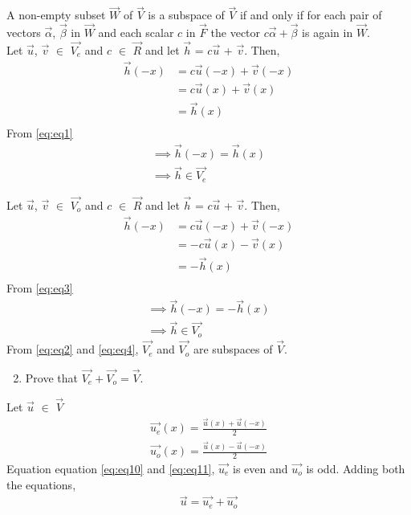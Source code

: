 \documentclass[journal,12pt,twocolumn]{IEEEtran}
\begin{document}
A non-empty subset $\vec{W}$ of $\vec{V}$ is a subspace of $\vec{V}$ if and only if for each pair of vectors $\vec{\alpha}$, $\vec{\beta}$ in $\vec{W}$ and each scalar $c$ in $\vec{F}$ the vector $c\vec{\alpha}+\vec{\beta}$ is again in $\vec{W}$.\\

Let $\vec{u}$, $\vec{v}$ $\in$ $\vec{V_e}$ and $c$ $\in$ $\vec{R}$ and let $\vec{h}$ = $c\vec{u}$ + $\vec{v}$. Then,
\begin{equation} \label{eq:eq1}
\begin{split}
\vec{h}(-x) &= c \vec{u}(-x) + \vec{v}(-x)\\
 & = c \vec{u}(x) + \vec{v}(x)\\
& = \vec{h}(x)\\
\end{split}
\end{equation}
From \eqref{eq:eq1}
\begin{align}
\implies \vec{h}(-x) = \vec{h}(x)\\
\implies \vec{h} \in \vec{V_e} \label{eq:eq2}
\end{align}

Let $\vec{u}$, $\vec{v}$ $\in$ $\vec{V_o}$ and $c$ $\in$ $\vec{R}$ and let $\vec{h}$ = $c\vec{u}$ + $\vec{v}$. Then,
\begin{equation} \label{eq:eq3}
\begin{split}
\vec{h}(-x) &= c \vec{u}(-x) + \vec{v}(-x)\\
 & = -c \vec{u}(x) - \vec{v}(x)\\
& = -\vec{h}(x)\\
\end{split}
\end{equation}
From \eqref{eq:eq3}
\begin{align}
\implies \vec{h}(-x) = -\vec{h}(x)\\
\implies \vec{h} \in \vec{V_o} \label{eq:eq4}
\end{align}
From \eqref{eq:eq2} and \eqref{eq:eq4}, $\vec{V_e}$ and $\vec{V_o}$ are subspaces of $\vec{V}$.\\
\begin{enumerate}
    \setcounter{enumi}{1}
   \item Prove that $\vec{V_e} + \vec{V_o} = \vec{V}$.
 \end{enumerate}
Let $\vec{u}$ $\in$ $\vec{V}$
\begin{align}
    \vec{u_e}(x) = \frac{\vec{u}(x)+\vec{u}(-x)}{2} \label{eq:eq10}\\
    \vec{u_o}(x) = \frac{\vec{u}(x)-\vec{u}(-x)}{2} \label{eq:eq11}
\end{align}
Equation equation \eqref{eq:eq10} and \eqref{eq:eq11}, $\vec{u_e}$ is even and $\vec{u_o}$ is odd. Adding both the equations,
\begin{align}
    \vec{u} = \vec{u_e} + \vec{u_o} \label{eq:eq12}
\end{align}
\end{document}
